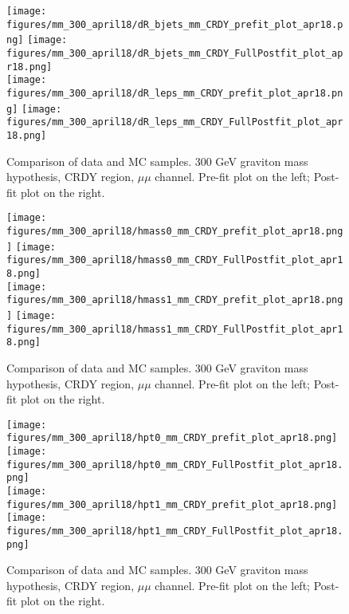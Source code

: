 \begin{figure}[H]
\begin{center}
\texttt{[image: figures/mm\_300\_april18/dR\_bjets\_mm\_CRDY\_prefit\_plot\_apr18.png]}
\texttt{[image: figures/mm\_300\_april18/dR\_bjets\_mm\_CRDY\_FullPostfit\_plot\_apr18.png]}\\
\texttt{[image: figures/mm\_300\_april18/dR\_leps\_mm\_CRDY\_prefit\_plot\_apr18.png]}
\texttt{[image: figures/mm\_300\_april18/dR\_leps\_mm\_CRDY\_FullPostfit\_plot\_apr18.png]}\\
\caption[Data-MC comparison in CRDY.]{Comparison of data and MC samples. 300 GeV graviton mass hypothesis, CRDY region, $\mu\mu$ channel. Pre-fit plot on the left; Post-fit plot on the right.}
\label{MCcomparisons_mm_low_CRDY_1}
\end{center}
\end{figure}


\begin{figure}[H]
\begin{center}
\texttt{[image: figures/mm\_300\_april18/hmass0\_mm\_CRDY\_prefit\_plot\_apr18.png]}
\texttt{[image: figures/mm\_300\_april18/hmass0\_mm\_CRDY\_FullPostfit\_plot\_apr18.png]}\\
\texttt{[image: figures/mm\_300\_april18/hmass1\_mm\_CRDY\_prefit\_plot\_apr18.png]}
\texttt{[image: figures/mm\_300\_april18/hmass1\_mm\_CRDY\_FullPostfit\_plot\_apr18.png]}\\
\caption[Data-MC comparison in CRDY.]{Comparison of data and MC samples. 300 GeV graviton mass hypothesis, CRDY region, $\mu\mu$ channel. Pre-fit plot on the left; Post-fit plot on the right.}
\label{MCcomparisons_mm_low_CRDY_2}
\end{center}
\end{figure}

\begin{figure}[H]
\begin{center}
\texttt{[image: figures/mm\_300\_april18/hpt0\_mm\_CRDY\_prefit\_plot\_apr18.png]}
\texttt{[image: figures/mm\_300\_april18/hpt0\_mm\_CRDY\_FullPostfit\_plot\_apr18.png]}\\
\texttt{[image: figures/mm\_300\_april18/hpt1\_mm\_CRDY\_prefit\_plot\_apr18.png]}
\texttt{[image: figures/mm\_300\_april18/hpt1\_mm\_CRDY\_FullPostfit\_plot\_apr18.png]}\\
\caption[Data-MC comparison in CRDY.]{Comparison of data and MC samples. 300 GeV graviton mass hypothesis, CRDY region, $\mu\mu$ channel. Pre-fit plot on the left; Post-fit plot on the right.}
\label{MCcomparisons_mm_low_CRDY_3}
\end{center}
\end{figure}

